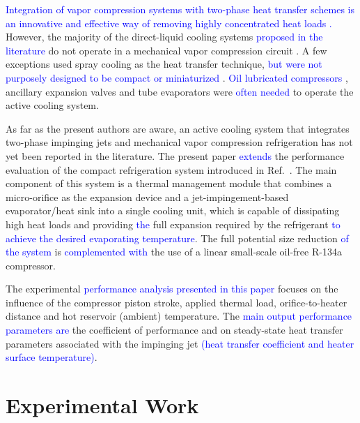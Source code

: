 \documentclass[review,preprint,12pt]{elsarticle}
\begin{document}
\textcolor{blue}{Integration of vapor compression systems with  two-phase heat transfer schemes is an innovative and effective way of removing highly concentrated heat loads \cite{OliveiraBarbosaJr.2016,BarbosaJr.2012,Trutassanawin2006,MarcinichenThomeMichel2010}.} However, the majority of the direct-liquid cooling systems  \textcolor{blue}{proposed in the literature} do not operate in a mechanical vapor compression circuit \cite{Whelan2012,Wang2011a,Browne2012,Parida2012,Buchanan2013,Joshi2015,Maddox2015,Gould2015}. A few exceptions used spray cooling as the heat transfer technique, \textcolor{blue}{but were not purposely designed to be compact or miniaturized} \cite{Yan2010,Tan2013,Xie2014,Chunqiang2012,Xu2014,Hou2015,Chen2015}. \textcolor{blue}{Oil lubricated compressors}  \cite{Chunqiang2012,Xu2014,Hou2015,Chen2015}, ancillary expansion valves \cite{Yan2010,Tan2013,Chunqiang2012,Xu2014} and tube evaporators \cite{Hou2015,Chen2015} were \textcolor{blue}{often needed} to operate the active cooling system.    

As far as the present authors are aware, an active cooling system that integrates two-phase impinging jets and mechanical vapor compression refrigeration has not yet been reported in the literature. The present paper \textcolor{blue}{extends} the performance evaluation of the compact refrigeration system introduced in Ref.~\cite{OliveiraBarbosaJr.2016}. The main component of this system is a thermal management module that combines a micro-orifice as the expansion device and a jet-impingement-based evaporator/heat sink into a single cooling unit, which is capable of dissipating high heat loads and providing \textcolor{blue}{the} full expansion required by the refrigerant \textcolor{blue}{to achieve the desired evaporating temperature}. The full potential size reduction \textcolor{blue}{of the system} is \textcolor{blue}{complemented with} the use of a linear small-scale oil-free R-134a compressor. 

The experimental \textcolor{blue}{performance analysis presented in this paper} focuses on the influence of the compressor piston stroke, applied thermal load, orifice-to-heater distance and hot reservoir (ambient) temperature. The \textcolor{blue}{main output performance parameters are} the coefficient of performance and on steady-state heat transfer parameters associated with the impinging jet \textcolor{blue}{(heat transfer coefficient and heater surface temperature)}.

\section{Experimental Work}
\end{document}
